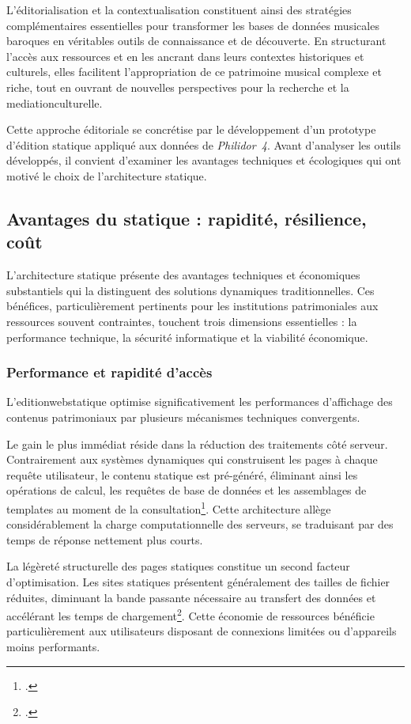 L'éditorialisation et la contextualisation constituent ainsi des stratégies complémentaires essentielles pour transformer les bases de données musicales baroques en véritables outils de connaissance et de découverte. En structurant l'accès aux ressources et en les ancrant dans leurs contextes historiques et culturels, elles facilitent l'appropriation de ce patrimoine musical complexe et riche, tout en ouvrant de nouvelles perspectives pour la recherche et la \gls{mediationculturelle}.

Cette approche éditoriale se concrétise par le développement d'un prototype d'édition statique appliqué aux données de \textit{Philidor~4}. Avant d'analyser les outils développés, il convient d'examiner les avantages techniques et écologiques qui ont motivé le choix de l'architecture statique.

\subsection{Avantages du statique : rapidité, résilience, coût}

L'architecture statique présente des avantages techniques et économiques substantiels qui la distinguent des solutions dynamiques traditionnelles. Ces bénéfices, particulièrement pertinents pour les institutions patrimoniales aux ressources souvent contraintes, touchent trois dimensions essentielles : la performance technique, la sécurité informatique et la viabilité économique.

\subsubsection{Performance et rapidité d'accès}

L'\gls{editionwebstatique} optimise significativement les performances d'affichage des contenus patrimoniaux par plusieurs mécanismes techniques convergents.

Le gain le plus immédiat réside dans la réduction des traitements côté serveur. Contrairement aux systèmes dynamiques qui construisent les pages à chaque requête utilisateur, le contenu statique est pré-généré, éliminant ainsi les opérations de calcul, les requêtes de base de données et les assemblages de templates au moment de la consultation\footcite{benzingLuwakContentManagement2006}. Cette architecture allège considérablement la charge computationnelle des serveurs, se traduisant par des temps de réponse nettement plus courts.

La légèreté structurelle des pages statiques constitue un second facteur d'optimisation. Les sites statiques présentent généralement des tailles de fichier réduites, diminuant la bande passante nécessaire au transfert des données et accélérant les temps de chargement\footcite{novaLowtechNumeriqueAux2020}. Cette économie de ressources bénéficie particulièrement aux utilisateurs disposant de connexions limitées ou d'appareils moins performants.


